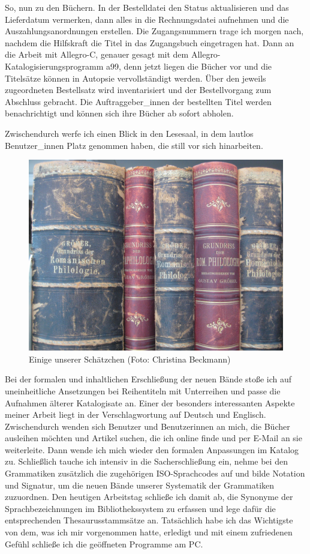 \documentclass[a4paper,
fontsize=11pt,
oneside,
numbers=noperiodatend,
parskip=half-,
bibliography=totoc,
final
]{scrartcl}
\begin{document}
So, nun zu den Büchern. In der Bestelldatei den Status aktualisieren und
das Lieferdatum vermerken, dann alles in die Rechnungsdatei aufnehmen
und die Auszahlungsanordnungen erstellen. Die Zugangsnummern trage ich
morgen nach, nachdem die Hilfskraft die Titel in das Zugangsbuch
eingetragen hat. Dann an die Arbeit mit Allegro-C, genauer gesagt mit
dem Allegro-Katalogisierungsprogramm a99, denn jetzt liegen die Bücher
vor und die Titelsätze können in Autopsie vervollständigt werden. Über
den jeweils zugeordneten Bestellsatz wird inventarisiert und der
Bestellvorgang zum Abschluss gebracht. Die Auftraggeber\_innen der
bestellten Titel werden benachrichtigt und können sich ihre Bücher ab
sofort abholen.

Zwischendurch werfe ich einen Blick in den Lesesaal, in dem lautlos
Benutzer\_innen Platz genommen haben, die still vor sich hinarbeiten.

\begin{figure}
\centering
\includegraphics{img/Beckmann_2.jpg}
\caption{Einige unserer Schätzchen (Foto: Christina Beckmann)}
\end{figure}

Bei der formalen und inhaltlichen Erschließung der neuen Bände stoße ich
auf uneinheitliche Ansetzungen bei Reihentiteln mit Unterreihen und
passe die Aufnahmen älterer Katalogisate an. Einer der besonders
interessanten Aspekte meiner Arbeit liegt in der Verschlagwortung auf
Deutsch und Englisch. Zwischendurch wenden sich Benutzer und
Benutzerinnen an mich, die Bücher ausleihen möchten und Artikel suchen,
die ich online finde und per E-Mail an sie weiterleite. Dann wende ich
mich wieder den formalen Anpassungen im Katalog zu. Schließlich tauche
ich intensiv in die Sacherschließung ein, nehme bei den Grammatiken
zusätzlich die zugehörigen ISO-Sprachcodes auf und bilde Notation und
Signatur, um die neuen Bände unserer Systematik der Grammatiken
zuzuordnen. Den heutigen Arbeitstag schließe ich damit ab, die Synonyme
der Sprachbezeichnungen im Bibliothekssystem zu erfassen und lege dafür
die entsprechenden Thesaurusstammsätze an. Tatsächlich habe ich das
Wichtigste von dem, was ich mir vorgenommen hatte, erledigt und mit
einem zufriedenen Gefühl schließe ich die geöffneten Programme am PC.
\end{document}

